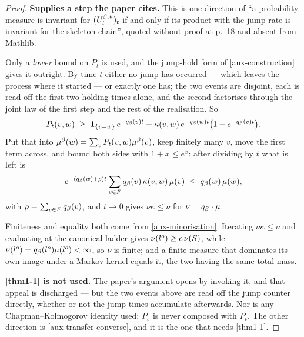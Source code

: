 \begin{proof}
  \leanok
  \textbf{Supplies a step the paper cites.}  This is one direction of ``a
  probability measure is invariant for $(U^{\beta,u}_t)_t$ if and only if its
  product with the jump rate is invariant for the skeleton chain'', quoted
  without proof at p.~18 and absent from Mathlib.

  Only a \emph{lower} bound on $P_t$ is used, and the jump-hold form of
  \ref{aux-construction} gives it outright.  By time $t$ either no jump has
  occurred --- which leaves the process where it started --- or exactly one has;
  the two events are disjoint, each is read off the first two holding times
  alone, and the second factorises through the joint law of the first step and
  the rest of the realisation.  So
  \[
    P_t(v,w) \;\ge\; \mathbf{1}_{\{v = w\}}\, e^{-q_\beta(v)t}
      + \kappa(v,w)\, e^{-q_\beta(w)t}\bigl(1 - e^{-q_\beta(v)t}\bigr) .
  \]
  Put that into $\mu^\beta(w) = \sum_v P_t(v,w)\mu^\beta(v)$, keep finitely many $v$,
  move the first term across, and bound both sides with $1 + x \le e^{x}$: after
  dividing by $t$ what is left is
  \[
    e^{-(q_\beta(w) + \rho)t} \sum_{v \in F} q_\beta(v)\,\kappa(v,w)\,\mu(v)
      \;\le\; q_\beta(w)\,\mu(w),
  \]
  with $\rho = \sum_{v \in F}q_\beta(v)$, and $t \to 0$ gives $\nu\kappa \le
  \nu$ for $\nu = q_\beta \cdot \mu$.

  Finiteness and equality both come from \ref{aux-minorisation}.  Iterating
  $\nu\kappa \le \nu$ and evaluating at the canonical ladder gives $\nu(l^o) \ge
  c\,\nu(S)$, while $\nu(l^o) = q_\beta(l^o)\mu(l^o) < \infty$, so $\nu$
  is finite; and a finite measure that dominates its own image under a Markov
  kernel equals it, the two having the same total mass.

  \textbf{\ref{thm1-1} is not used.}  The paper's argument opens by invoking it,
  and that appeal is discharged --- but the two events above are read off the
  jump counter directly, whether or not the jump times accumulate afterwards.
  Nor is any Chapman--Kolmogorov identity used: $P_s$ is never composed with
  $P_t$.  The other direction is \ref{aux-transfer-converse}, and it is the one
  that needs \ref{thm1-1}.
\end{proof}

